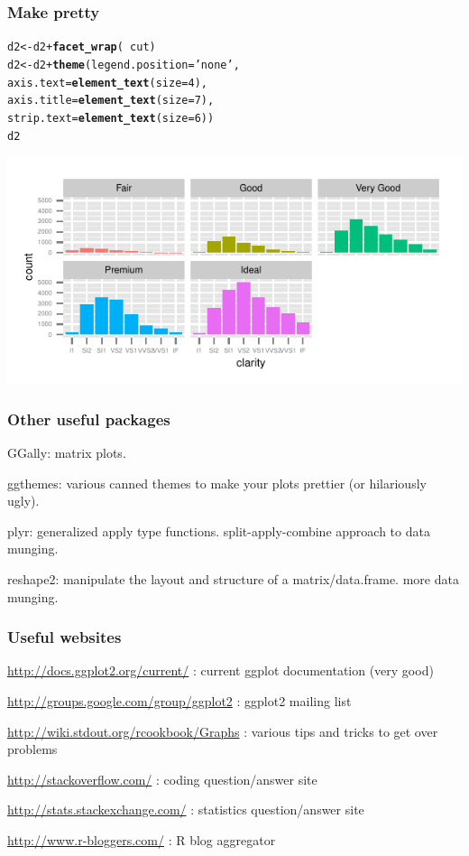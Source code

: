 \documentclass{beamer}\usepackage{graphicx, color}
\makeatletter
\def\maxwidth{ %
  \ifdim\Gin@nat@width>\linewidth
    \linewidth
  \else
    \Gin@nat@width
  \fi
}
\newcommand{\hlfunctioncall}[1]{\textcolor[rgb]{0.501960784313725,0,0.329411764705882}{\textbf{#1}}}%
\newcommand{\hlstring}[1]{\textcolor[rgb]{0.6,0.6,1}{#1}}%
\newenvironment{kframe}{%
 \def\at@end@of@kframe{}%
 \ifinner\ifhmode%
  \def\at@end@of@kframe{\end{minipage}}%
  \begin{minipage}{\columnwidth}%
 \fi\fi%
 \def\FrameCommand##1{\hskip\@totalleftmargin \hskip-\fboxsep
 \colorbox{shadecolor}{##1}\hskip-\fboxsep
     \hskip-\linewidth \hskip-\@totalleftmargin \hskip\columnwidth}%
 \MakeFramed {\advance\hsize-\width
   \@totalleftmargin\z@ \linewidth\hsize
   \@setminipage}}%
 {\par\unskip\endMakeFramed%
 \at@end@of@kframe}
\newenvironment{knitrout}{}{} %
\makeatother
\begin{document}
\begin{frame}[fragile]
  \frametitle{Make pretty}
\begin{knitrout}
\color{fgcolor}\begin{kframe}
\begin{alltt}
d2 <- d2 + \hlfunctioncall{facet_wrap}(~ cut)
d2 <- d2 + \hlfunctioncall{theme}(legend.position = \hlstring{'none'},
                 axis.text = \hlfunctioncall{element_text}(size = 4),
                 axis.title = \hlfunctioncall{element_text}(size = 7),
                 strip.text = \hlfunctioncall{element_text}(size = 6))
d2
\end{alltt}
\end{kframe}
\includegraphics[width=\maxwidth]{figure/dia3-upgrade} 

\end{knitrout}

\end{frame}


\begin{frame}
  \frametitle{Other useful packages}

  GGally: matrix plots.

  ggthemes: various canned themes to make your plots prettier (or hilariously ugly).

  plyr: generalized apply type functions. split-apply-combine approach to data munging.

  reshape2: manipulate the layout and structure of a matrix/data.frame. more data munging.

\end{frame}

\begin{frame}
  \frametitle{Useful websites}

  \url{http://docs.ggplot2.org/current/} : current ggplot documentation (very good)

  \url{http://groups.google.com/group/ggplot2} : ggplot2 mailing list

  \url{http://wiki.stdout.org/rcookbook/Graphs} : various tips and tricks to get over problems

  \url{http://stackoverflow.com/} : coding question/answer site

  \url{http://stats.stackexchange.com/} : statistics question/answer site

  \url{http://www.r-bloggers.com/} : R blog aggregator

\end{frame}
\end{document}
